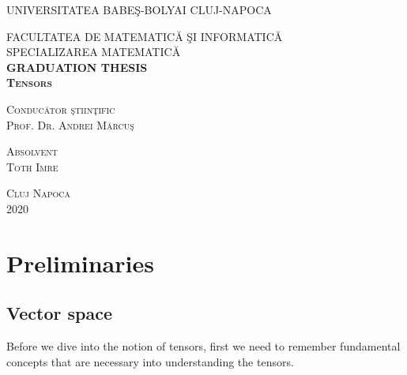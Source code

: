 \documentclass[12pt,a4paper]{article}
\begin{document}
\begin{titlepage}
\begin{center}

\textsc{ \large UNIVERSITATEA BABEŞ-BOLYAI CLUJ-NAPOCA}\\\medskip

\textsc{\large FACULTATEA DE MATEMATICĂ ŞI INFORMATICĂ}\\\medskip
\textsc{\large SPECIALIZAREA MATEMATICĂ }\\[4 cm]

\textsc{\LARGE\textbf{GRADUATION THESIS} }\\[1 cm]
\textsc{\LARGE\textbf{Tensors}}\\[7 cm]
\begin{flushleft}
\textsc{\Large Conducător ştiinţific}\\
\textsc{\Large Prof. Dr. Andrei Mărcuş }\\[2 cm]
\end{flushleft}
\begin{flushright}
\textsc{\Large Absolvent}\\
\textsc{\Large Toth Imre}\\[3 cm]
\end{flushright}
\textsc{\Large Cluj Napoca\\ 2020}
\end{center}
\end{titlepage}
\renewcommand{\contentsname}{Cuprins}
\renewcommand{\refname}{Bibliografie}
\setcounter{page}{0}
\tableofcontents
\newpage
\section{Preliminaries}
\subsection{Vector space}
Before we dive into the notion of tensors, first we need to remember fundamental concepts that are necessary into understanding the tensors.
\end{document}
